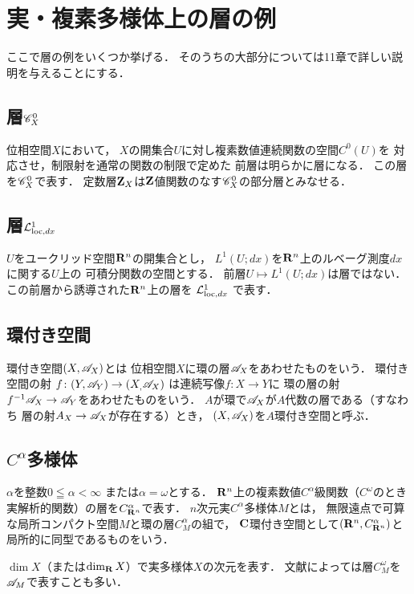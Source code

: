 \setcounter{section}{8}
\section{実・複素多様体上の層の例}\label{sec29}
ここで層の例をいくつか挙げる．
そのうちの大部分については11章で詳しい説明を与えることにする．

\subsection{層\(\Conti_X^0\)}
位相空間\(X\)において，
\(X\)の開集合\(U\)に対し複素数値連続関数の空間\(C^0(U)\)を
対応させ，制限射を通常の関数の制限で定めた
前層は明らかに層になる．
この層を\(\Conti_X^0\)で表す．
定数層\(\zz_X\)は\(\zz\)値関数のなす\(\Conti_X^0\)の部分層とみなせる．

\subsection{層\(\Lloc[dx]\)}
\(U\)をユークリッド空間\(\rr^n\)の開集合とし，
\(L^1(U;dx)\)を\(\rr^n\)上のルベーグ測度\(dx\)に関する\(U\)上の
可積分関数の空間とする．
前層\(U\mapsto L^1(U;dx)\)は層ではない．
この前層から誘導された\(\rr^n\)上の層を
\(\Lloc[dx]\)
で表す．

\subsection{環付き空間}
環付き空間\((X,\scA_X)\)とは
位相空間\(X\)に環の層\(\scA_X\)をあわせたものをいう．
環付き空間の射
\(f\colon(Y,\scA_Y)\to(X_,\scA_X)\)
は連続写像\(f\colon X\to Y\)に
環の層の射\(f^{-1}\scA_X\to\scA_Y\)をあわせたものをいう．
\(A\)が環で\(\scA_X\)が\(A\)代数の層である（すなわち
層の射\(A_X\to\scA_X\)が存在する）とき，
\((X,\scA_X)\)を\(A\)環付き空間と呼ぶ．

\subsection{\(C^\alpha\)多様体}
\(\alpha\)を整数\(0\leqq\alpha<\infty\)
または\(\alpha=\omega\)とする．
\(\rr^n\)上の複素数値\(C^\alpha\)級関数（\(C^\omega\)のとき
実解析的関数）の層を\(C^\alpha_{\rr^n}\)で表す．
\(n\)次元実\(C^\alpha\)多様体\(M\)とは，
無限遠点で可算な局所コンパクト空間\(M\)と環の層\(C^\alpha_M\)の組で，
\(\cc\)環付き空間として\((\rr^n,C^\alpha_{\rr^n})\)と
局所的に同型であるものをいう．

\(\dim X\)（または\(\dim_\rr X\)）で実多様体\(X\)の次元を表す．
文献によっては層\(C^\omega_M\)を\(\scA_M\)で表すことも多い．

